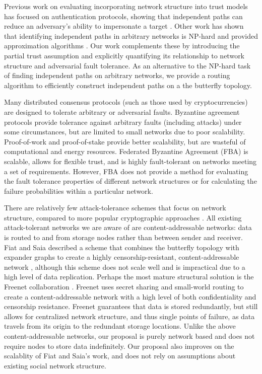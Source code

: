 \documentclass{sig-alternate-05-2015}
\begin{document}
Previous work on evaluating incorporating network structure into
trust models has focused on authentication
protocols, showing that independent paths can reduce an adversary's ability
to impersonate a target
\cite{levien_attack-resistant_2009}.
Other work has shown that identifying independent paths in arbitrary networks
is NP-hard and provided approximation algorithms
\cite{reiter_resilient_1998}.
Our work complements these by introducing the partial trust assumption and
explicitly quantifying its relationship to network structure and adversarial
fault tolerance.
As an alternative to the NP-hard task of finding independent paths on arbitrary
networks, we provide a routing algorithm to efficiently construct independent
paths on a the butterfly topology.

Many distributed consensus protocols (such as those used by cryptocurrencies)
are designed to tolerate arbitrary or adversarial faults.
Byzantine agreement protocols
\cite{lamport_byzantine_1982,castro_practical_1999}
provide tolerance against arbitrary faults (including attacks) under
some circumstances, but are limited to small networks due to poor scalability.
Proof-of-work \cite{dwork_pricing_1993,nakamoto_bitcoin:_2008}
and proof-of-stake \cite{king_ppcoin:_2012}
provide better scalability,
but are wasteful of computational and energy resources.
Federated Byzantine Agreement (FBA) \cite{mazieres_stellar_2015}
is scalable, allows for flexible trust,
and is highly fault-tolerant on networks meeting a set of requirements.
However, FBA does not provide a method for evaluating the
fault tolerance properties of different network structures
or for calculating the failure probabilities within a particular network.

There are relatively few attack-tolerance schemes
that focus on network structure,
compared to more popular cryptographic approaches
\cite{ferguson_practical_2003}.
All existing attack-tolerant networks we are aware of are content-addressable
networks: data is routed to and from storage nodes rather than between sender
and receiver.
Fiat and Saia described a scheme that combines the butterfly topology
with expander graphs to create a highly censorship-resistant,
content-addressable network \cite{fiat_censorship_2002},
although this scheme does not scale well and is impractical due to a
high level of data replication.
Perhaps the most mature structural solution is the Freenet collaboration
\cite{clarke_freenet:_2001}.
Freenet uses secret sharing
\cite{shamir_how_1979, blakley_safeguarding_1979}
and small-world routing
\cite{zhang_using_2002,kleinberg_small-world_2000}
to create a content-addressable network with a high level of both
confidentiality and censorship resistance.
Freenet guarantees that data is stored redundantly,
but still allows for centralized network structure,
and thus single points of failure,
as data travels from its origin to the redundant storage locations.
Unlike the above content-addressable networks, our proposal is purely network based
and does not require nodes to store data indefinitely.
Our proposal also improves on the scalablity of Fiat and Saia's work,
and does not rely on assumptions about existing social network structure.
\end{document}

